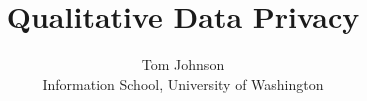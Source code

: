 \documentclass [11pt]{article}
\title{Qualitative Data Privacy}
\author{Tom Johnson\\Information School, University of Washington}
\begin{document}
\maketitle

\nocite{*}


\end{document}
